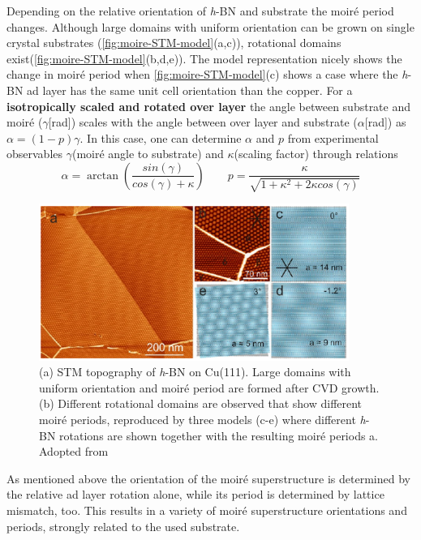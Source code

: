 Depending on the relative orientation of \textit{h}-BN and substrate the moir\'e period changes. Although large domains with uniform orientation can be grown on single crystal substrates (\autoref{fig:moire-STM-model}(a,c)), rotational domains exist(\autoref{fig:moire-STM-model}(b,d,e)).
The model representation nicely shows the change in moir\'e period when
\autoref{fig:moire-STM-model}(c) shows a case where the \textit{h}-BN ad layer has the same unit cell orientation than the copper. For a \textbf{isotropically scaled and rotated over layer} the angle between substrate and moir\'e ($\gamma$[rad]) scales with the angle between over layer and substrate ($\alpha$[rad]) as $\alpha=(1-p)\gamma$.
In this case, one can determine $\alpha$ and $p$ from experimental observables $\gamma$(moir\'e angle to substrate) and $\kappa$(scaling factor) through relations $$ \alpha=\arctan \left ( \frac{sin(\gamma)}{cos(\gamma)+\kappa} \right )\qquad p=\frac{\kappa}{\sqrt{1+\kappa^2+2\kappa cos(\gamma)}}$$

\begin{figure} \centering
	\includegraphics[width=0.9\textwidth]{./images/h-BN-cvd-cu111.png}%
\caption{(a) STM topography of \textit{h}-BN on Cu(111). Large domains with uniform orientation and moir\'e period are formed after CVD growth. (b) Different rotational domains are observed that show different moir\'e periods, reproduced by three models (c-e) where different \textit{h}-BN rotations are shown together with the resulting moir\'e periods a. Adopted from \cite{joshi_boron_2012}}
\label{fig:moire-STM-model}
\end{figure}

As mentioned above the orientation of the moir\'e superstructure is determined by the relative ad layer rotation alone, while its period is determined by lattice mismatch, too. This results in a variety of moir\'e superstructure orientations and periods, strongly related to the used substrate.
	
